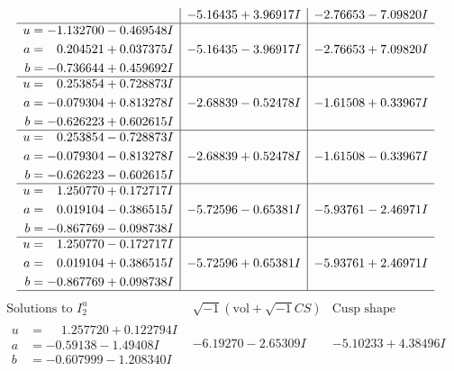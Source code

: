\documentclass[1p]{elsarticle_modified}
\theoremstyle{definition}
\newcommand{\I}{\sqrt{-1}}
\begin{document}
$$\begin{array}{c|c|c}
 & -5.16435 + 3.96917 I & -2.76653 - 7.09820 I \\ \hline\begin{aligned}
u &= -1.132700 - 0.469548 I \\
a &= \phantom{-}0.204521 + 0.037375 I \\
b &= -0.736644 + 0.459692 I\end{aligned}
 & -5.16435 - 3.96917 I & -2.76653 + 7.09820 I \\ \hline\begin{aligned}
u &= \phantom{-}0.253854 + 0.728873 I \\
a &= -0.079304 + 0.813278 I \\
b &= -0.626223 + 0.602615 I\end{aligned}
 & -2.68839 - 0.52478 I & -1.61508 + 0.33967 I \\ \hline\begin{aligned}
u &= \phantom{-}0.253854 - 0.728873 I \\
a &= -0.079304 - 0.813278 I \\
b &= -0.626223 - 0.602615 I\end{aligned}
 & -2.68839 + 0.52478 I & -1.61508 - 0.33967 I \\ \hline\begin{aligned}
u &= \phantom{-}1.250770 + 0.172717 I \\
a &= \phantom{-}0.019104 - 0.386515 I \\
b &= -0.867769 - 0.098738 I\end{aligned}
 & -5.72596 - 0.65381 I & -5.93761 - 2.46971 I \\ \hline\begin{aligned}
u &= \phantom{-}1.250770 - 0.172717 I \\
a &= \phantom{-}0.019104 + 0.386515 I \\
b &= -0.867769 + 0.098738 I\end{aligned}
 & -5.72596 + 0.65381 I & -5.93761 + 2.46971 I\\
 \hline 
 \end{array}$$\newpage$$\begin{array}{c|c|c}  
\text{Solutions to }I^u_{2}& \I (\text{vol} + \sqrt{-1}CS) & \text{Cusp shape}\\
 \hline 
\begin{aligned}
u &= \phantom{-}1.257720 + 0.122794 I \\
a &= -0.59138 - 1.49408 I \\
b &= -0.607999 - 1.208340 I\end{aligned}
 & -6.19270 - 2.65309 I & -5.10233 + 4.38496 I \\ \hline\begin{aligned}

\end{aligned}
\end{array}$$
\end{document}
